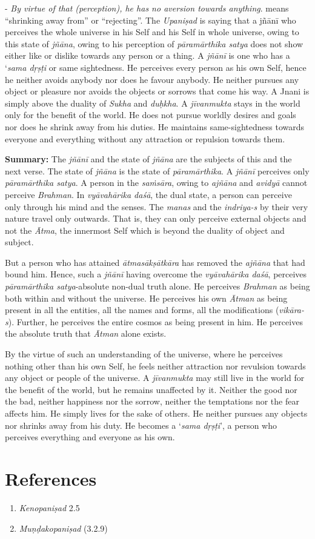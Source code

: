 - \emph{By virtue of that (perception), he has no aversion towards anything}.  means ``shrinking away from'' or ``rejecting''. The \emph{Upaniṣad} is saying that a jñānī who perceives the whole universe in his Self and his Self in whole universe, owing to this state of \emph{jñāna}, owing to his perception of \emph{pāramārthika satya} does not show either like or dislike towards any person or a thing. A \emph{jñānī} is one who has a `\emph{sama dṛṣṭi} or same sightedness. He perceives every person as his own Self, hence he neither avoids anybody nor does he favour anybody. He neither pursues any object or pleasure nor avoids the objects or sorrows that come his way. A Jnani is simply above the duality of \emph{Sukha} and \emph{duḥkha}. A \emph{jīvanmukta} stays in the world only for the benefit of the world. He does not pursue worldly desires and goals nor does he shrink away from his duties. He maintains same-sightedness towards everyone and everything without any attraction or repulsion towards them.

\textbf{Summary:} The \emph{jñānī} and the state of \emph{jñāna} are the subjects of this and the next verse. The state of \emph{jñāna} is the state of \emph{pāramārthika}. A \emph{jñānī} perceives only \emph{pāramārthika satya}. A person in the \emph{saṁsāra}, owing to \emph{ajñāna} and \emph{avidyā} cannot perceive \emph{Brahman}. In \emph{vyāvahārika daśā}, the dual state, a person can perceive only through his mind and the senses. The \emph{manas} and the \emph{indriya-s} by their very nature travel only outwards. That is, they can only perceive external objects and not the \emph{Ātma}, the innermost Self which is beyond the duality of object and subject.

But a person who has attained \emph{ātmasākṣātkāra} has removed the \emph{ajñāna} that had bound him. Hence, such a \emph{jñānī} having overcome the \emph{vyāvahārika daśā}, perceives \emph{pāramārthika satya}-absolute non-dual truth alone. He perceives \emph{Brahman} as being both within and without the universe. He perceives his own \emph{Ātman} as being present in all the entities, all the names and forms, all the modifications (\emph{vikāra-s}). Further, he perceives the entire cosmos as being present in him. He perceives the absolute truth that \emph{Ātman} alone exists.

By the virtue of such an understanding of the universe, where he perceives nothing other than his own Self, he feels neither attraction nor revulsion towards any object or people of the universe. A \emph{jīvanmukta} may still live in the world for the benefit of the world, but he remains unaffected by it. Neither the good nor the bad, neither happiness nor the sorrow, neither the temptations nor the fear affects him. He simply lives for the sake of others. He neither pursues any objects nor shrinks away from his duty. He becomes a `\emph{sama dṛṣṭi}', a person who perceives everything and everyone as his own.

\section*{References}

\begin{enumerate}
\itemsep=0pt
\item
  \emph{Kenopaniṣad} 2.5
\item
  \emph{Muṇḍakopaniṣad} (3.2.9)
\end{enumerate}

